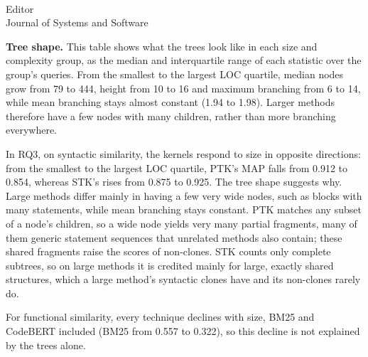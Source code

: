 \documentclass[
pagenumber=false, %
parskip=half, %
fromalign=right, %
foldmarks=false, %
addrfield=false %
]{scrlttr2}
\begin{document}
\begin{letter}{\\Editor\\Journal of Systems and Software}


\medskip\noindent\textbf{Tree shape.} This table shows what the trees look like in each size and complexity group, as
the median and interquartile range of each statistic over the group's queries. From the smallest to the largest LOC
quartile, median nodes grow from 79 to 444, height from 10 to 16 and maximum branching from 6 to 14, while mean branching
stays almost constant (1.94 to 1.98). Larger methods therefore have a few nodes with many children, rather than more
branching everywhere.


\medskip\noindent In RQ3, on syntactic similarity, the kernels respond to size in
opposite directions: from the smallest to the largest LOC quartile, PTK's MAP falls from 0.912 to
0.854, whereas STK's rises from 0.875 to 0.925. The tree shape suggests why. Large methods differ
mainly in having a few very wide nodes, such as blocks with many statements, while mean branching
stays constant. PTK matches any subset of a node's children, so a wide node yields very many partial
fragments, many of them generic statement sequences that unrelated methods also contain; these
shared fragments raise the scores of non-clones. STK counts only complete subtrees, so on large
methods it is credited mainly for large, exactly shared structures, which a large method's syntactic
clones have and its non-clones rarely do. 

For functional similarity, every technique declines with
size, BM25 and CodeBERT included (BM25 from 0.557 to 0.322), so this decline is not explained by the trees alone.

%




\end{letter}
\end{document}
